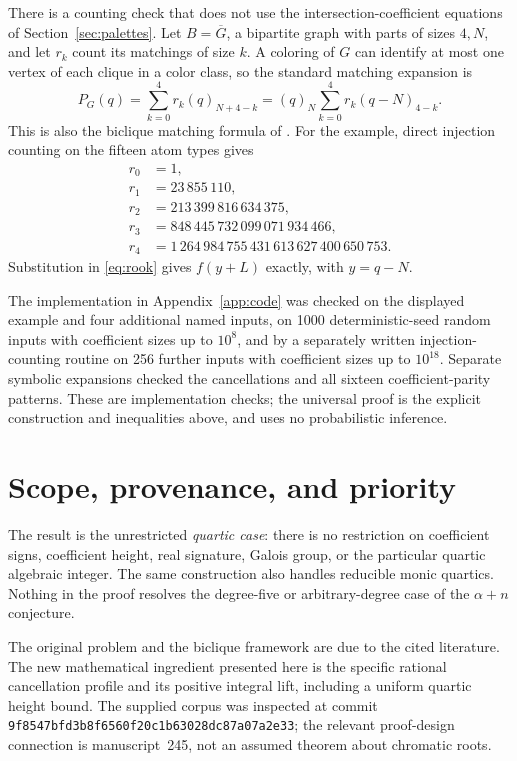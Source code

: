 \documentclass[11pt,a4paper]{article}
\theoremstyle{definition}
\newcommand{\fall}[2]{(#1)_{#2}}
\begin{document}
There is a counting check that does not use the intersection-coefficient
equations of Section~\ref{sec:palettes}. Let $B=\overline G$, a bipartite
graph with parts of sizes $4,N$, and let $r_k$ count its matchings of
size $k$. A coloring of $G$ can identify at most one vertex of each
clique in a color class, so the standard matching expansion is
\begin{equation}\label{eq:rook}
 P_G(q)=\sum_{k=0}^4r_k\fall q{N+4-k}
       =\fall qN\sum_{k=0}^4r_k\fall{q-N}{4-k}.
\end{equation}
This is also the biclique matching formula of \cite[Section 2.1]{Bohn}.
For the example, direct injection counting on the fifteen atom types gives
\begin{align*}
 r_0&=1,\\
 r_1&=23\,855\,110,\\
 r_2&=213\,399\,816\,634\,375,\\
 r_3&=848\,445\,732\,099\,071\,934\,466,\\
 r_4&=1\,264\,984\,755\,431\,613\,627\,400\,650\,753.
\end{align*}
Substitution in \eqref{eq:rook} gives $f(y+L)$ exactly, with $y=q-N$.

The implementation in Appendix~\ref{app:code} was checked on the displayed
example and four additional named inputs, on 1000 deterministic-seed
random inputs with coefficient sizes up to $10^8$, and by a separately
written injection-counting routine on 256 further inputs with coefficient
sizes up to $10^{18}$. Separate symbolic expansions checked the cancellations
and all sixteen coefficient-parity patterns. These are implementation
checks; the universal proof is the explicit construction and inequalities
above, and uses no probabilistic inference.

\section{Scope, provenance, and priority}\label{sec:scope}

The result is the unrestricted \emph{quartic case}: there is no restriction
on coefficient signs, coefficient height, real signature, Galois group,
or the particular quartic algebraic integer. The same construction also
handles reducible monic quartics. Nothing in the proof resolves the
degree-five or arbitrary-degree case of the $\alpha+n$ conjecture.

The original problem and the biclique framework are due to the cited
literature. The new mathematical ingredient presented here is the
specific rational cancellation profile and its positive integral lift,
including a uniform quartic height bound. The supplied corpus was inspected
at commit \texttt{9f8547bfd3b8f6560f20c1b63028dc87a07a2e33}; the
relevant proof-design connection is manuscript~245, not an assumed theorem
about chromatic roots.
\end{document}
